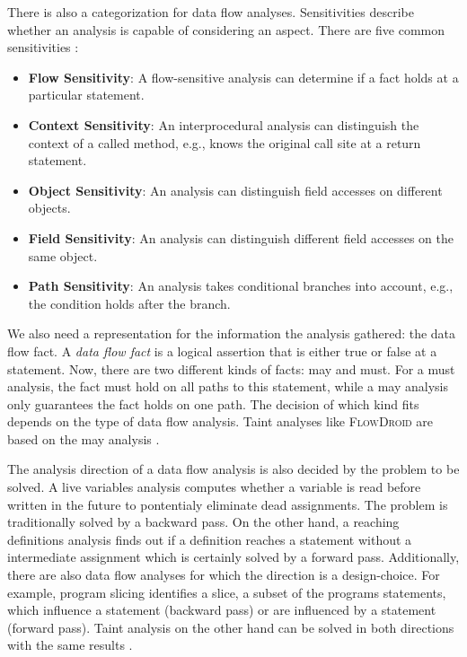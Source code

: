 \documentclass[../draft.tex]{subfiles}
\begin{document}
    There is also a categorization for data flow analyses. 
    Sensitivities describe whether an analysis is capable of considering an aspect. 
    There are five common sensitivities \cite{Khedker2009,Arzt2017PhD}:
    \begin{itemize}
        \item \textbf{Flow Sensitivity}: A flow-sensitive analysis can determine if a fact holds at a particular statement.
        \item \textbf{Context Sensitivity}: An interprocedural analysis can distinguish the context of a called method, e.g., knows the original call site at a return statement.
        \item \textbf{Object Sensitivity}: An analysis can distinguish field accesses on different objects.
        \item \textbf{Field Sensitivity}: An analysis can distinguish different field accesses on the same object.
        \item \textbf{Path Sensitivity}: An analysis takes conditional branches into account, e.g., the condition holds after the branch.
    \end{itemize}

    We also need a representation for the information the analysis gathered: the data flow fact. 
    A \textit{data flow fact} is a logical assertion that is either true or false at a statement. 
    Now, there are two different kinds of facts: may and must. 
    For a must analysis, the fact must hold on all paths to this statement, while a may analysis only guarantees the fact holds on one path. 
    The decision of which kind fits depends on the type of data flow analysis. 
    Taint analyses like \textsc{FlowDroid} are based on the may analysis \cite{Arzt2017PhD}.

    The analysis direction of a data flow analysis is also decided by the problem to be solved. 
    A live variables analysis computes whether a variable is read before written in the future to pontentialy eliminate dead assignments. 
    The problem is traditionally solved by a backward pass. 
    On the other hand, a reaching definitions analysis finds out if a definition reaches a statement without a intermediate assignment which is certainly solved by a forward pass.
    Additionally, there are also data flow analyses for which the direction is a design-choice.
    For example, program slicing identifies a slice, a subset of the programs statements, which influence a statement (backward pass) or are influenced by a statement (forward pass).
    Taint analysis on the other hand can be solved in both directions with the same results \cite{Khedker2009}.
    
\end{document}

